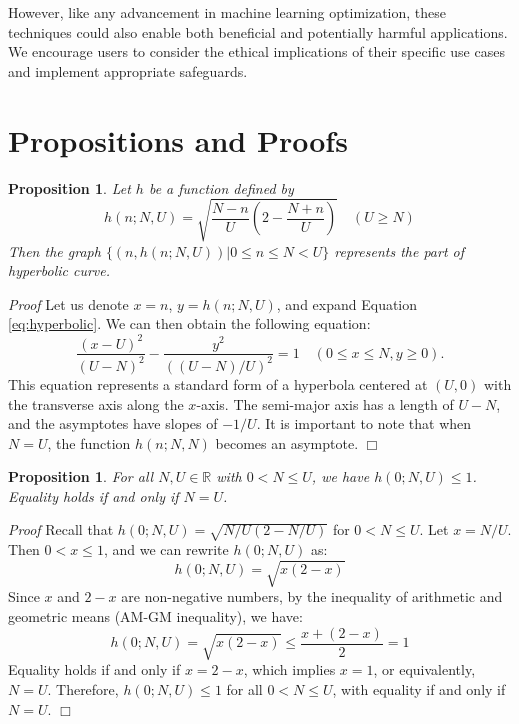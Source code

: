 \documentclass{article}
\theoremstyle{plain}
\newtheorem{proposition}[theorem]{Proposition}
\theoremstyle{definition}
\theoremstyle{remark}
\begin{document}
However, like any advancement in machine learning optimization, these techniques could also enable both beneficial and potentially harmful applications. We encourage users to consider the ethical implications of their specific use cases and implement appropriate safeguards.

\nocite{langley00}





\newpage
\appendix
\onecolumn

\section{Propositions and Proofs}
\label{sec:props_and_proofs}

\begin{proposition}
Let $h$ be a function defined by
\begin{equation}
    h(n; N, U) = \sqrt{\frac{N - n}{U} \left(2 - \frac{N + n}{U}\right)} \quad (U \geq N)
    \label{eq:hyperbolic}
\end{equation}
Then the graph $\{(n, h(n; N, U)) | 0 \leq n \leq N < U\}$ represents the part of hyperbolic curve.

\end{proposition}

\noindent \textit{Proof}
Let us denote $x = n$, $y = h(n;N,U)$, and expand Equation \ref{eq:hyperbolic}. We can then obtain the following equation:
\begin{equation}
\frac{(x - U)^2}{(U - N)^2} - \frac{y^2}{((U - N) / U)^2} = 1 \quad (0 \leq x \leq N, y \geq 0).
\label{eq:hyperbola}
\end{equation}
This equation represents a standard form of a hyperbola centered at $(U, 0)$ with the transverse axis along the $x$-axis.
The semi-major axis has a length of $U-N$, and the asymptotes have slopes of $-1/U$.
It is important to note that when $N=U$, the function $h(n;N,N)$ becomes an asymptote. \hfill$\Box$

\begin{proposition}
For all $N, U \in \mathbb{R}$ with $0 < N \leq U$, we have $h(0; N, U) \leq 1$. Equality holds if and only if $N = U$.
\end{proposition}

\noindent \textit{Proof}
Recall that $h(0; N, U) = \sqrt{N/U (2 - N/U)}$ for $0 < N \leq U$.
Let $x = N/U$. Then $0 < x \leq 1$, and we can rewrite $h(0; N, U)$ as:
\[
h(0; N, U) = \sqrt{x(2-x)}
\]
Since $x$ and $2-x$ are non-negative numbers, by the inequality of arithmetic and geometric means (AM-GM inequality), we have:
\[
h(0; N, U) = \sqrt{x(2-x)} \leq \frac{x + (2-x)}{2} = 1
\]
Equality holds if and only if $x = 2-x$, which implies $x = 1$, or equivalently, $N = U$.
Therefore, $h(0; N, U) \leq 1$ for all $0 < N \leq U$, with equality if and only if $N = U$. \hfill$\Box$
\end{document}
